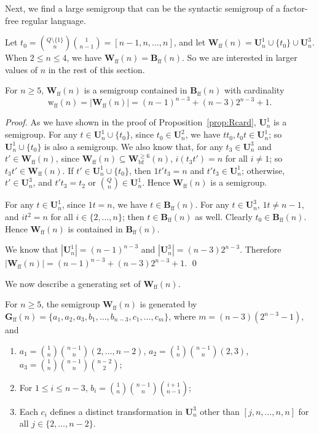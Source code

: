 \documentclass{llncs}
\renewcommand{\le}{\leqslant}
\renewcommand{\ge}{\geqslant}
\newcommand{\be}{\begin{enumerate}}
\newcommand{\ee}{\end{enumerate}}
\newcommand{\Bff}{\mathbf{B}_{\mathrm{ff}}}
\newcommand{\Wbf}{\mathbf{W}^{\ge 6}_{\mathrm{bf}}}
\newcommand{\Wff}{\mathbf{W}_{\mathrm{ff}}}
\newcommand{\Hff}{\mathbf{G}_{\mathrm{ff}}}
\newcommand{\Uf}{\mathbf{U}}
\newcommand{\wff}{{\mathrm{w}_{\mathrm{ff}}}}
\begin{document}
Next, we find a large semigroup that can be the syntactic semigroup of a factor-free regular language. 

Let $t_0 = {Q \setminus \{1\} \choose n}{1 \choose n-1} = [n-1, n, \ldots, n]$, and let $\Wff(n) = \Uf^1_n \cup \{t_0\} \cup \Uf^3_n$. When $2 \le n \le 4$, we have $\Wff(n) = \Bff(n)$. So we are interested in larger values of $n$ in the rest of this section. 

\begin{proposition}\label{prop:Uncard}
For $n \ge 5$, $\Wff(n)$ is a semigroup contained in $\Bff(n)$ with cardinality 
$$\wff(n) = |\Wff(n)| = (n-1)^{n-3} + (n-3)2^{n-3} + 1.$$
\end{proposition}

\begin{proof}

As we have shown in the proof of Proposition~\ref{prop:Rcard}, $\Uf^1_n$ is a semigroup. For any $t \in \Uf^1_n \cup \{t_0\}$, since $t_0 \in \Uf^2_n$, we have $tt_0, t_0t \in \Uf^1_n$; so $\Uf^1_n \cup \{t_0\}$ is also a semigroup. We also know that, for any $t_3 \in \Uf^3_n$ and $t' \in \Wff(n)$, since $\Wff(n) \subseteq \Wbf(n)$, $i(t_3t') = n$ for all $i \neq 1$; so $t_3t' \in \Wff(n)$. If $t' \in \Uf^1_n \cup \{t_0\}$, then $1t't_3 = n$ and $t't_3 \in \Uf^1_n$; otherwise, $t' \in \Uf^3_n$, and $t't_3 = t_2$ or ${Q \choose n} \in \Uf^1_n$. Hence $\Wff(n)$ is a semigroup. 

For any $t \in \Uf^1_n$, since $1t = n$, we have $t \in \Bff(n)$. For any $t \in \Uf^3_n$, $1t \neq n-1$, and $it^2 = n$ for all $i \in \{2,\ldots,n\}$; then $t \in \Bff(n)$ as well. Clearly $t_0 \in \Bff(n)$. Hence $\Wff(n)$ is contained in $\Bff(n)$. 

We know that $|\Uf^1_n| = (n-1)^{n-3}$ and $|\Uf^3_n| = (n-3)2^{n-3}$. Therefore $|\Wff(n)| = (n-1)^{n-3} + (n-3)2^{n-3} + 1$. \qed
\end{proof}

We now describe a generating set of $\Wff(n)$. 
\begin{proposition}\label{prop:Ugen} 
For $n \ge 5$, the semigroup $\Wff(n)$ is generated by $\Hff(n) = \{a_1, a_2, a_3, b_1, \ldots, b_{n-3}, c_1, \ldots, c_m\}$, where $m = (n-3)(2^{n-3}-1)$, and 
\be
\item $a_1 = {1 \choose n}{n-1 \choose n}(2,\ldots,n-2)$, $a_2 = {1 \choose n}{n-1 \choose n}(2,3)$, $a_3 = {1 \choose n}{n-1 \choose n}{n-2 \choose 2}$; 
\item For $1 \le i \le n-3$, $b_i = {1 \choose n}{n-1 \choose n}{i+1 \choose n-1}$; 
\item Each $c_i$ defines a distinct transformation in $\Uf^3_n$ other than $[j,n,\ldots,n,n]$ for all $j \in \{2,\ldots,n-2\}$.
\ee
\end{proposition}
\end{document}
